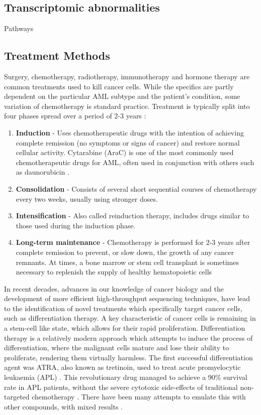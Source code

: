 \subsection{Transcriptomic abnormalities}
Pathways


\subsection{ Treatment Methods}
\label{Treatment Methods}
Surgery, chemotherapy, radiotherapy, immunotherapy and hormone therapy are common treatments used to kill cancer cells. While the specifics are partly dependent on the particular \ac{AML} subtype and the patient's condition, some variation of chemotherapy is standard practice. Treatment is typically split into four phases spread over a period of 2-3 years \citep{malard2020acute}:  

\begin{enumerate}
\item \textbf{Induction} - Uses chemotherapeutic drugs with the intention of achieving complete remission (no symptoms or signs of cancer) and restore normal cellular activity. Cytarabine (AraC) is one of the most commonly used chemotherapeutic drugs for \ac{AML}, often used in conjunction with others such as daunorubicin \citep{Robak2009}.
\item \textbf{Consolidation} - Consists of several short sequential courses of chemotherapy every two weeks, usually using stronger doses.
\item \textbf{Intensification} - Also called reinduction therapy, includes drugs similar to those used during the induction phase.
\item \textbf{Long-term maintenance} - Chemotherapy is performed for 2-3 years after complete remission to prevent, or slow down, the growth of any cancer remnants. At times, a bone marrow or stem cell transplant is sometimes necessary to replenish the supply of healthy hematopoietic cells
\end{enumerate}

In recent decades, advances in our knowledge of cancer biology and the development of more efficient high-throughput sequencing techniques, have lead to the identification of novel treatments which specifically target cancer cells, such as differentiation therapy. A key characteristic of cancer cells is remaining in a stem-cell like state, which allows for their rapid proliferation. Differentiation therapy is a relatively modern approach which attempts to induce the process of differentiation, where the malignant cells mature and lose their ability to proliferate, rendering them virtually harmless. The first successful differentiation agent was \ac{ATRA}, also known as tretinoin, used to treat acute promyelocytic leukaemia (APL) \citep{chomienne1990all}. This revolutionary drug managed to achieve a 90\% survival rate in APL patients, without the severe cytotoxic side-effects of traditional non-targeted chemotherapy \citep{kim2015selection}. There have been many attempts to emulate this with other compounds, with mixed results \citep{nowak2009differentiation}.

